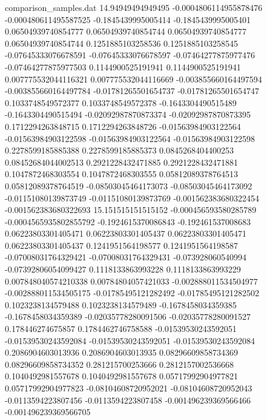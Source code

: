 \begin{filecontents}{comparison_samples.dat}
14.94949494949495   -0.0004806114955878476  -0.000480611495587525   -0.1845439995005414    -0.1845439995005401    0.06504939740854777    0.06504939740854744    0.06504939740854777    0.06504939740854744    0.1251885103258536     0.1251885103258545     -0.07645333076678591    -0.07645333076678597    -0.07464277875977476   -0.07464277875977503   0.1144900525191941      0.1144900525191941      0.007775532044116321    0.007775532044116669    -0.003855660164497594   -0.003855660164497784   -0.01781265501654737    -0.01781265501654747    0.1033748549572377      0.1033748549572378      -0.1643304490515489     -0.1643304490515494     -0.02092987870873374   -0.02092987870873395   0.1712294263848715     0.1712294263848726     -0.01563984903122564    -0.01563984903122598    -0.01563984903122564    -0.01563984903122598    0.2278599185885388     0.2278599185885373     0.0845268404400253      0.08452684044002513     0.2921228432471885     0.2921228432471881     0.1047872468303554      0.1047872468303555      0.05812089378764513     0.05812089378764519     -0.08503045464173073   -0.08503045464173092   -0.01151080139873749   -0.01151080139873769   -0.001562383680322454   -0.001562383680322693 
15.151515151515152  -0.000456593580285789   -0.0004565935802855792  -0.1924615370086843    -0.192461537008683     0.06223803301405471    0.06223803301405437    0.06223803301405471    0.06223803301405437    0.1241951564198577     0.1241951564198587     -0.07008031764329421    -0.07008031764329431    -0.073928060540994     -0.07392806054099427   0.1118133863993228      0.1118133863993229      0.007848040574210338    0.00784804057421033     -0.002888011534504977   -0.002888011534505175   -0.01785495121282492    -0.01785495121282502    0.1023238134579488      0.1023238134579489      -0.1678458034359385     -0.1678458034359389     -0.02035778280091506   -0.02035778280091527   0.178446274675857      0.1784462746758588     -0.01539530243592051    -0.01539530243592084    -0.01539530243592051    -0.01539530243592084    0.2086904603013936     0.2086904603013935     0.08296609858734369     0.08296609858734352     0.281215700253666      0.2812157002536668     0.1040492981557678      0.1040492981557678      0.05717992904977821     0.05717992904977823     -0.08104608720952021   -0.08104608720952043   -0.0113594223807456    -0.0113594223807458    -0.001496239369566466   -0.001496239369566705 

\end{filecontents}
